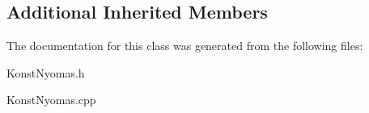 \subsection*{Additional Inherited Members}


The documentation for this class was generated from the following files\+:\begin{DoxyCompactItemize}
\item 
Konst\+Nyomas.\+h\item 
Konst\+Nyomas.\+cpp\end{DoxyCompactItemize}
